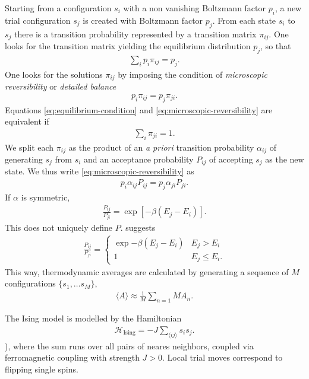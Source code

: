 Starting from a configuration $s_i$ with a non vanishing Boltzmann factor $p_i$, a new trial configuration $s_j$ is created with Boltzmann factor $p_j$. 
From each state $s_i$ to $s_j$ there is a transition probability represented by a transition matrix $\pi_{ij}$. One looks for the transition matrix yielding the equilibrium distribution $p_j$, so that 
\begin{align}
	\sum_i p_i \pi_{ij} = p_j.
	\label{eq:equilibrium-condition}
\end{align}
One looks for the solutions $\pi_{ij}$ by imposing the condition of \textit{microscopic reversibility} or \textit{detailed balance}
\begin{align}
	p_i \pi_{ij} = p_j \pi_{ji}.
	\label{eq:microscopic-reversibility}
\end{align}
Equations \eqref{eq:equilibrium-condition} and \eqref{eq:microscopic-reversibility} are equivalent if
\begin{align}
	\sum_i \pi_{ji} = 1.
\end{align}
We split each $\pi_{ij}$ as the product of an \textit{a priori} transition probability $\alpha_{ij}$ of generating $s_j$ from $s_i$ and an acceptance probability $P_{ij}$ of accepting $s_j$ as the new state. We thus write \eqref{eq:microscopic-reversibility} as 
\begin{align}
	p_i \alpha_{ij} P_{ij} = p_j \alpha_{ji} P_{ji}.
\end{align}
If $\alpha$ is symmetric, 
\begin{align}
	\frac{P_{ij}}{P_{ji}} = \exp[ - \beta ( E_j - E_i)].
\end{align}
This does not uniquely define $P$. \cite{Metropolis1953} suggests 
\begin{align}
	\frac{P_{ij}}{P_{ji}} = 
	\begin{cases}
		\exp{-\beta (E_j - E_i)} & E_j > E_i \\
		1 & E_j \leq E_i.
		\end{cases}
\end{align}
This way, thermodynamic averages are calculated by generating a sequence of $M$ configurations $\{ s_1, \ldots s_M \}$, 
\begin{align}
	\langle A \rangle \approx \frac{1}{M} \sum_{n=1 }{M}A_n.
\end{align}

The Ising model is modelled by the Hamiltonian
\begin{align}
	\mathcal{H}_\text{Ising} = -J \sum_{\langle ij \rangle} s_i s_j.
\end{align}),
where the sum runs over all pairs of neares neighbors, coupled via ferromagnetic coupling with strength $J>0$. Local trial moves correspond to flipping single spins.

